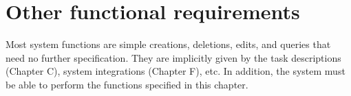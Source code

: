 \documentclass[Main]{subfiles}
\begin{document}
\chapter{Other functional requirements}
Most system functions are simple creations, deletions, edits, and queries that need no further specification. They are implicitly given by the task descriptions (Chapter C), system integrations (Chapter F), etc. In addition, the system must be able to perform the functions specified in this chapter.





\end{document}
